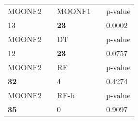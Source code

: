 \begin{tabular}{ l l l l l}
\midrule
{MOONF2} & & {MOONF1} & & {p-value}\\
13 & & \textbf{23} & & 0.0002\\
\midrule
{MOONF2} & & {DT} & & {p-value}\\
12 & & \textbf{23} & & 0.0757\\
\midrule
{MOONF2} & & {RF} & & {p-value}\\
\textbf{32} & & 4 & & 0.4274\\
\midrule
{MOONF2} & & {RF-b} & & {p-value}\\
\textbf{35} & & 0 & & 0.9097\\
\midrule
\end{tabular}

